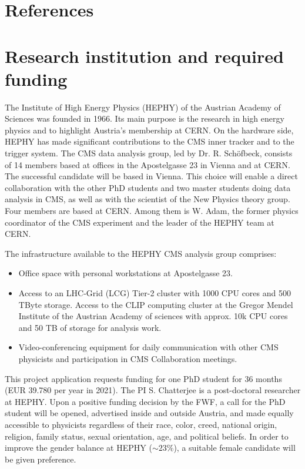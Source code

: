 \documentclass[a4paper,11pt]{article}
\begin{document}
\appendix
\renewcommand{\thesection}{Annex \arabic{section}} 

\clearpage
\section{References}
\renewcommand{\refname}{}
{
%


}

\newpage

\section{Research institution and required funding}

The Institute of High Energy Physics (HEPHY) of the Austrian Academy of Sciences was founded in 1966. 
Its main purpose is the research in high energy physics and to highlight Austria's membership at CERN. 
On the hardware side, HEPHY has made significant contributions to the CMS inner tracker and to the trigger system. 
The CMS data analysis group, led by Dr. R. Sch{\"o}fbeck, consists of 14 members based at offices in the Apostelgasse 23 in Vienna and at CERN. The successful candidate will be based in Vienna. 
This choice will enable a direct collaboration with the other PhD students and two master students doing data analysis in CMS, as well as with the scientist of the New Physics theory group.
Four members are based at CERN. 
Among them is  W.  Adam, the former physics coordinator of the CMS experiment and the leader of the HEPHY team at CERN.

The infrastructure available to the HEPHY CMS analysis group comprises:
\begin{itemize}
\item Office space with personal workstations at Apostelgasse 23.
\item Access to an LHC-Grid (LCG) Tier-2 cluster with 1000 CPU cores and 500 TByte storage. Access to the CLIP computing cluster at the Gregor Mendel Institute of the Austrian Academy of sciences with approx. 10k CPU cores and 50 TB of
storage for analysis work.
\item Video-conferencing equipment for daily communication with other CMS physicists and participation in CMS Collaboration meetings.
\end{itemize}

This project application requests funding for one PhD student for 36
months (EUR 39.780 per year in 2021). 
The PI S. Chatterjee is a post-doctoral researcher at HEPHY.
Upon a positive funding decision by the FWF, a call for the PhD student will be opened, advertised inside and outside Austria, and made equally accessible to physicists regardless of their race, color, creed, national origin, religion, family status, sexual orientation, age, and political beliefs. 
In order to improve the gender balance at HEPHY ($\sim 23\%$), a suitable female candidate will be given preference.
\end{document}
